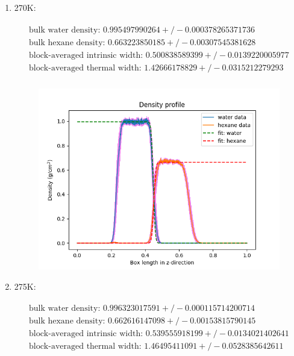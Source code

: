 \documentclass[12pt,reqno]{amsart}
\numberwithin{equation}{section}
\begin{document}
\begin{enumerate}
\item 270K: 

\begin{align}
\begin{split}
\text{bulk water density: } 0.995497990264  +/- 0.000378265371736 \\
\text{bulk hexane density: } 0.663223850185  +/- 0.00307545381628\\
\text{block-averaged intrinsic width: } 0.500838589399  +/- 0.0139220005977\\
\text{block-averaged thermal width: } 1.42666178829  +/- 0.0315212279293 \\
\end{split}
\end{align} 

\begin{figure}[H]
\centering
\includegraphics[scale=0.6]{interface_density_profile_full-270-32bead}
\end{figure}

\item 275K: 

\begin{align}
\begin{split}
\text{bulk water density: } 0.996323017591  +/- 0.000115714200714 \\
\text{bulk hexane density: } 0.662616147098  +/- 0.00153815790145\\
\text{block-averaged intrinsic width: } 0.539555918199  +/- 0.0134021402641\\
\text{block-averaged thermal width: } 1.46495411091  +/- 0.0528385642611 \\
\end{split}
\end{align} 


\end{enumerate}
\end{document}

